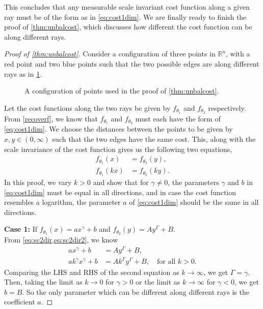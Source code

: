 \documentclass{article}
\newcommand{\ti}{{\theta_1}}
\newcommand{\tii}{{\theta_2}}
\begin{document}
This concludes that any measurable scale invariant cost function along
a given ray must
be of the form as in \cref{eq:cost1dim}.
We are finally ready to finish the proof of \cref{thm:unbalcost}, which discusses how different the cost function can be along different
rays.


\begin{proof}[Proof of \cref{thm:unbalcost}]
  Consider a configuration of three points in $\mathbb{R}^n$, with a
  red point and two blue points such that the two possible edges are
  along different rays as in \cref{fig:unbalcostlast}.
  \begin{figure}[h]
    \centering

\caption{A configuration of points used in the proof of
  \cref{thm:unbalcost}.} \label{fig:unbalcostlast}
  \end{figure}


  Let the cost functions along the two rays be
  given by $f_{\ti}$ and $f_{\tii}$ respectively.
From \cref{recoverf}, we know that $f_{\ti} $ and $f_{\tii}$ must each
have the form of  \eqref{eq:cost1dim}.
  We choose the distances
  between the points to be given by $x,y\in(0,\infty)$
  such that the two edges have the same cost. This, along with the
  scale invariance of the cost function gives us the following two
  equations,
  \begin{align}
    \label{eq:sc2dir}
    f_{\ti}(x) &= f_{\tii}(y),\\
     f_{\theta_1}(kx) &= f_{\theta_2}(ky). \label{eq:sc2dir2}
  \end{align}
  In this proof, we vary $k>0$ and show that for $\gamma\neq 0$, the parameters $\gamma$
  and $b$ in \eqref{eq:cost1dim}
  must be equal in all directions, and in case the cost
  function resembles a  logarithm, the parameter $a$ of \eqref{eq:cost1dim} should be the
  same in all directions.

  {\bf Case 1:} If $f_{\theta_1}(x) = a x^{\gamma} +b$ and $f_{\theta_2}(y) =
  A y^{\Gamma} +B$.\\
  From \cref{eq:sc2dir,eq:sc2dir2}, we
  know
  \begin{align}
    a  x^{\gamma} +b &= A  y^{\Gamma} +B, \nonumber\\
    a k^{\gamma} x^{\gamma} +b &= A k^{\Gamma} y^{\Gamma} +B, \quad
    \mbox{for all } k>0. \nonumber
  \end{align}
  Comparing the LHS and RHS of the second equation as
  $k\rightarrow\infty$, we get $\Gamma=\gamma$. Then,
  taking the limit as $k\rightarrow 0$ for $\gamma>0$ or the limit as
  $k\rightarrow\infty$ for $\gamma<0$, we get $b=B$. So the only parameter which can be different along
  different rays is the coefficient $a$.


\end{proof}
\end{document}
